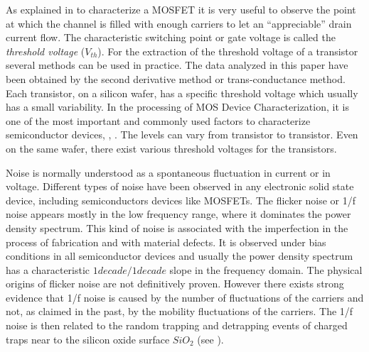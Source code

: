 \documentclass[sn-mathphys]{sn-jnl}%
\theoremstyle{thmstyleone}%
\theoremstyle{thmstyletwo}%
\theoremstyle{thmstylethree}%
\begin{document}
As explained in \cite{Schroder2006} to characterize a MOSFET it is very useful to observe the point at which the channel is filled with enough carriers to let an ``appreciable'' drain current flow. The characteristic switching point or gate voltage is called the {\it threshold voltage} ($V_{th}$). For the extraction of the threshold voltage of a transistor several methods can be used in practice. The data analyzed in this paper have been obtained by the second derivative method or trans-conductance method.
Each transistor, on a silicon wafer, has a specific threshold voltage which usually has a small variability. 
In the processing of MOS Device Characterization, it is one of the most important and commonly used factors to characterize semiconductor devices, \cite{Duty2016}, \cite{Schroder2006}. The levels can vary from transistor to transistor. Even on the same wafer, there exist various threshold voltages for the transistors. %

Noise is normally understood as a spontaneous fluctuation in current or in voltage. Different types of noise have been observed in any electronic solid state device, including semiconductors devices like MOSFETs. The flicker noise or 1/f noise appears mostly in the low frequency range, where it dominates the power density spectrum. This kind of noise is associated with the imperfection in the process of fabrication and with material defects. It is observed under bias conditions in all semiconductor devices and usually the power density spectrum has a characteristic $1decade/1decade$ slope in the frequency domain. The physical origins of flicker noise are not definitively proven. However there exists strong evidence that 1/f noise is caused by the number of fluctuations of the carriers and not, as claimed in the past, by the mobility fluctuations of the carriers. The 1/f noise is then related to the random trapping and detrapping events of charged traps near to the silicon oxide surface $SiO_2$ (see \cite{HKHC1990}).\ 
\end{document}
